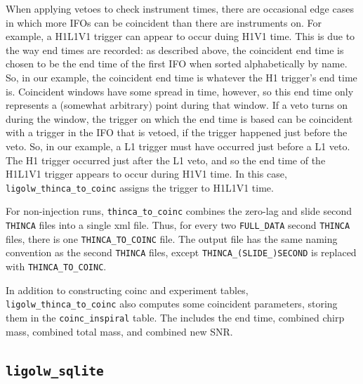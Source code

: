 When applying vetoes to check instrument times, there are occasional edge cases in which more \acp{IFO} can be coincident than there are instruments on. For example, a H1L1V1 trigger can appear to occur duing H1V1 time. This is due to the way end times are recorded: as described above, the coincident end time is chosen to be the end time of the first \ac{IFO} when sorted alphabetically by name. So, in our example, the coincident end time is whatever the H1 trigger's end time is. Coincident windows have some spread in time, however, so this end time only represents a (somewhat arbitrary) point during that window. If a veto turns on during the window, the trigger on which the end time is based can be coincident with a trigger in the \ac{IFO} that is vetoed, if the trigger happened just before the veto. So, in our example, a L1 trigger must have occurred just before a L1 veto. The H1 trigger occurred just after the L1 veto, and so the end time of the H1L1V1 trigger appears to occur during H1V1 time. In this case, \texttt{ligolw\_thinca\_to\_coinc} assigns the trigger to H1L1V1 time.

For non-injection runs, \texttt{thinca\_to\_coinc} combines the zero-lag and slide second \texttt{THINCA} files into a single xml file. Thus, for every two \texttt{FULL\_DATA} second \texttt{THINCA} files, there is one \texttt{THINCA\_TO\_COINC} file. The output file has the same naming convention as the second \texttt{THINCA} files, except \texttt{THINCA\_(SLIDE\_)SECOND} is replaced with \texttt{THINCA\_TO\_COINC}.

In addition to constructing coinc and experiment tables, \texttt{ligolw\_thinca\_to\_coinc} also computes some coincident parameters, storing them in the \texttt{coinc\_inspiral} table. The includes the end time, combined chirp mass, combined total mass, and combined new \ac{SNR}.

\subsection{\texttt{ligolw\_sqlite}}

